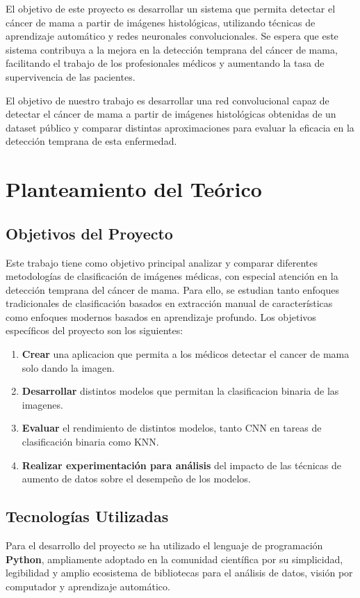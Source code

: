 \documentclass[12pt]{article} %
\begin{document}
El objetivo de este proyecto es desarrollar un sistema que permita detectar el cáncer de mama a partir de imágenes histológicas, utilizando técnicas de aprendizaje automático y redes neuronales convolucionales. Se espera que este sistema contribuya a la mejora en la detección temprana del cáncer de mama, facilitando el trabajo de los profesionales médicos y aumentando la tasa de supervivencia de las pacientes.

El objetivo de nuestro trabajo es desarrollar una red convolucional capaz de detectar el cáncer de mama a partir de imágenes histológicas obtenidas de un dataset público \cite{nasser2023deep} y comparar distintas aproximaciones para evaluar la eficacia en la detección temprana de esta enfermedad.

\newpage
\section{Planteamiento del Teórico}
\subsection{Objetivos del Proyecto}
Este trabajo tiene como objetivo principal analizar y comparar diferentes metodologías de clasificación de imágenes médicas, con especial atención en la detección temprana del cáncer de mama. Para ello, se estudian tanto enfoques tradicionales de clasificación basados en extracción manual de características como enfoques modernos basados en aprendizaje profundo. Los objetivos específicos del proyecto son los siguientes:\\


\begin{enumerate}
    \item \textbf{Crear} una aplicacion que permita a los médicos detectar el cancer de mama solo dando la imagen.
    \item \textbf{Desarrollar} distintos modelos que permitan la clasificacion binaria de las imagenes.
    \item \textbf{Evaluar} el rendimiento de distintos modelos, tanto CNN en tareas de clasificación binaria como KNN.
    \item \textbf{Realizar experimentación para análisis} del  impacto de las técnicas de aumento de datos sobre el desempeño de los modelos.

\end{enumerate}
\subsection{Tecnologías Utilizadas}
Para el desarrollo del proyecto se ha utilizado el lenguaje de programación \textbf{Python}, ampliamente adoptado en la comunidad científica por su simplicidad, legibilidad y amplio ecosistema de bibliotecas para el análisis de datos, visión por computador y aprendizaje automático.\\
\end{document}
